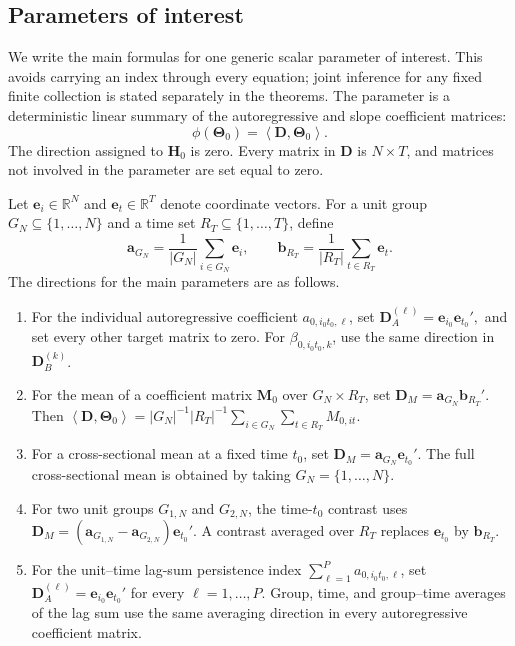 \documentclass[11pt]{article}
\numberwithin{equation}{section}
\theoremstyle{remark}
\newcommand{\R}{\mathbb R}
\newcommand{\ip}[2]{\left\langle #1,#2\right\rangle}
\newcommand{\be}{\bm e}
\newcommand{\bD}{\bm D}
\newcommand{\bH}{\bm H}
\newcommand{\bM}{\bm M}
\newcommand{\bTheta}{\bm\Theta}
\begin{document}
\subsection{Parameters of interest}

We write the main formulas for one generic scalar parameter of interest. This avoids carrying an index through every equation; joint inference for any fixed finite collection is stated separately in the theorems. The parameter is a deterministic linear summary of the autoregressive and slope coefficient matrices:
\begin{equation}
\label{eq:target}
\phi(\bTheta_0)=\ip{\bD}{\bTheta_0}.
\end{equation}
The direction assigned to $\bH_0$ is zero. Every matrix in $\bD$ is $N\times T$, and matrices not involved in the parameter are set equal to zero.

Let $\be_i\in\R^N$ and $\be_t\in\R^T$ denote coordinate vectors. For a unit group $G_N\subseteq\{1,\ldots,N\}$ and a time set $R_T\subseteq\{1,\ldots,T\}$, define
$$
\bm a_{G_N}
=
\frac{1}{|G_N|}
\sum_{i\in G_N}\be_i,
\qquad
\bm b_{R_T}
=
\frac{1}{|R_T|}
\sum_{t\in R_T}\be_t.
$$
The directions for the main parameters are as follows.

\begin{enumerate}[label=(\roman*),leftmargin=2em]
\item For the individual autoregressive coefficient $a_{0,i_0t_0,\ell}$, set
$
\bD_A^{(\ell)}=\be_{i_0}\be_{t_0}',
$
and set every other target matrix to zero. For $\beta_{0,i_0t_0,k}$, use the same direction in $\bD_B^{(k)}$.

\item For the mean of a coefficient matrix $\bM_0$ over $G_N\times R_T$, set
$
\bD_M=\bm a_{G_N}\bm b_{R_T}'.
$
Then $\ip{\bD}{\bTheta_0}=|G_N|^{-1}|R_T|^{-1}\sum_{i\in G_N}\sum_{t\in R_T}M_{0,it}$.

\item For a cross-sectional mean at a fixed time $t_0$, set
$
\bD_M=\bm a_{G_N}\be_{t_0}'.
$
The full cross-sectional mean is obtained by taking $G_N=\{1,\ldots,N\}$.

\item For two unit groups $G_{1,N}$ and $G_{2,N}$, the time-$t_0$ contrast uses
$
\bD_M
=
(\bm a_{G_{1,N}}-\bm a_{G_{2,N}})\be_{t_0}'.
$
A contrast averaged over $R_T$ replaces $\be_{t_0}$ by $\bm b_{R_T}$.

\item For the unit--time lag-sum persistence index $\sum_{\ell=1}^{P}a_{0,i_0t_0,\ell}$, set
$
\bD_A^{(\ell)}=\be_{i_0}\be_{t_0}'
$
 for every $\ell=1,\ldots,P.
$
Group, time, and group--time averages of the lag sum use the same averaging direction in every autoregressive coefficient matrix.
\end{enumerate}
\end{document}
